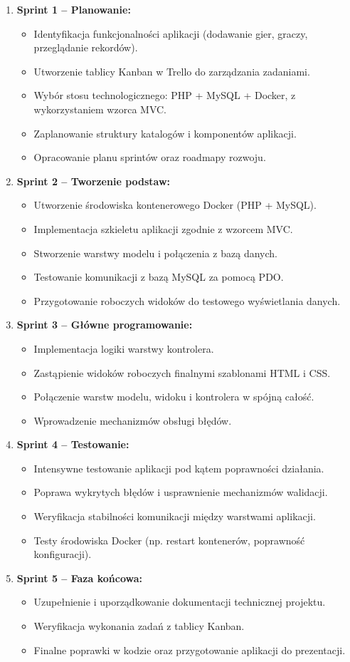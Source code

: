 \documentclass[12pt,a4paper]{article}
\begin{document}
\begin{enumerate}
	\item \textbf{Sprint 1 -- Planowanie:}
	\begin{itemize}
		\item Identyfikacja funkcjonalności aplikacji (dodawanie gier, graczy, przeglądanie rekordów).
		\item Utworzenie tablicy Kanban w Trello do zarządzania zadaniami.
		\item Wybór stosu technologicznego: PHP + MySQL + Docker, z wykorzystaniem wzorca MVC.
		\item Zaplanowanie struktury katalogów i komponentów aplikacji.
		\item Opracowanie planu sprintów oraz roadmapy rozwoju.
	\end{itemize}
	\item \textbf{Sprint 2 -- Tworzenie podstaw:}
	\begin{itemize}
		\item Utworzenie środowiska kontenerowego Docker (PHP + MySQL).
		\item Implementacja szkieletu aplikacji zgodnie z wzorcem MVC.
		\item Stworzenie warstwy modelu i połączenia z bazą danych.
		\item Testowanie komunikacji z bazą MySQL za pomocą PDO.
		\item Przygotowanie roboczych widoków do testowego wyświetlania danych.
	\end{itemize}
	\item \textbf{Sprint 3 -- Główne programowanie:}
	\begin{itemize}
		\item Implementacja logiki warstwy kontrolera.
		\item Zastąpienie widoków roboczych finalnymi szablonami HTML i CSS.
		\item Połączenie warstw modelu, widoku i kontrolera w spójną całość.
		\item Wprowadzenie mechanizmów obsługi błędów.
	\end{itemize}
	\item \textbf{Sprint 4 -- Testowanie:}
	\begin{itemize}
		\item Intensywne testowanie aplikacji pod kątem poprawności działania.
		\item Poprawa wykrytych błędów i usprawnienie mechanizmów walidacji.
		\item Weryfikacja stabilności komunikacji między warstwami aplikacji.
		\item Testy środowiska Docker (np. restart kontenerów, poprawność konfiguracji).
        \end{itemize}
	\item \textbf{Sprint 5 -- Faza końcowa:}
	\begin{itemize}
			\item Uzupełnienie i uporządkowanie dokumentacji technicznej projektu.
			\item Weryfikacja wykonania zadań z tablicy Kanban.
			\item Finalne poprawki w kodzie oraz przygotowanie aplikacji do prezentacji.
	\end{itemize}
	

\end{enumerate}
\end{document}

